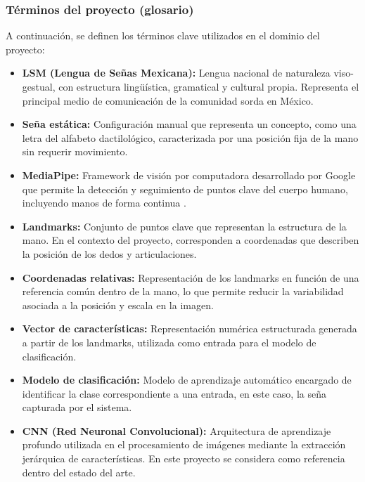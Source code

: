 	\subsubsection{Términos del proyecto (glosario)}
	
	A continuación, se definen los términos clave utilizados en el dominio del proyecto:
	
	\begin{itemize}
		
		\item \textbf{LSM (Lengua de Señas Mexicana):} Lengua nacional de naturaleza viso-gestual, con estructura lingüística, gramatical y cultural propia. Representa el principal medio de comunicación de la comunidad sorda en México.
		
		\item \textbf{Seña estática:} Configuración manual que representa un concepto, como una letra del alfabeto dactilológico, caracterizada por una posición fija de la mano sin requerir movimiento.
		
		\item \textbf{MediaPipe:} Framework de visión por computadora desarrollado por Google que permite la detección y seguimiento de puntos clave del cuerpo humano, incluyendo manos de forma continua .
		
		\item \textbf{Landmarks:} Conjunto de puntos clave que representan la estructura de la mano. En el contexto del proyecto, corresponden a coordenadas que describen la posición de los dedos y articulaciones.
		
		\item \textbf{Coordenadas relativas:} Representación de los landmarks en función de una referencia común dentro de la mano, lo que permite reducir la variabilidad asociada a la posición y escala en la imagen.
		
		\item \textbf{Vector de características:} Representación numérica estructurada generada a partir de los landmarks, utilizada como entrada para el modelo de clasificación.
		
		\item \textbf{Modelo de clasificación:} Modelo de aprendizaje automático encargado de identificar la clase correspondiente a una entrada, en este caso, la seña capturada por el sistema.
		
		\item \textbf{CNN (Red Neuronal Convolucional):} Arquitectura de aprendizaje profundo utilizada en el procesamiento de imágenes mediante la extracción jerárquica de características. En este proyecto se considera como referencia dentro del estado del arte.
		

\end{itemize}
